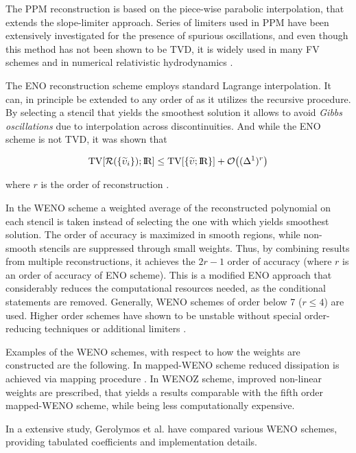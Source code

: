 The PPM reconstruction is based on the piece-wise parabolic interpolation, that extends the slope-limiter approach. 
Series of limiters used in PPM have been extensively investigated for the presence of spurious oscillations, and even though this method has not been shown to be TVD, it is widely used in many FV schemes and in numerical relativistic hydrodynamics \cite{Baiotti:2004wn,Mignone:2005ns}.

The ENO reconstruction scheme employs standard Lagrange interpolation. 
It can, in principle be extended to any order of as it utilizes the recursive procedure. 
By selecting a stencil that yields the smoothest solution it allows to avoid \textit{Gibbs oscillations} due to interpolation across discontinuities. 
And while the ENO scheme is not TVD, it was shown that 

\begin{equation}
\text{TV}[\mathcal{R}(\{\widetilde{\upsilon}_i\}); \text{I\!R}] \leq \text{TV}[\{\widetilde{\upsilon}; \text{I\!R}\}] + \mathcal{O}\big((\Delta^1)^r\big)
\end{equation}

where $r$ is the order of reconstruction \cite{Harten:1987}. 

In the WENO scheme a weighted average of the reconstructed polynomial on each stencil is taken instead of selecting the one with which yields smoothest solution. 
The order of accuracy is maximized in smooth regions, while non-smooth stencils are suppressed through small weights. 
Thus, by combining results from multiple reconstructions, it achieves the $2r-1$ order of accuracy (where $r$ is an order of accuracy of ENO scheme). 
This is a modified ENO approach that considerably reduces the computational resources needed, as the conditional statements are removed. 
Generally, WENO schemes of order below 7 ($r\leq 4$) are used. 
Higher order schemes have shown to be unstable without special order-reducing techniques \cite{Gerolymos:2009,Tchekhovskoy:2007zn} or additional limiters \cite{Balsara:2000}.

Examples of the WENO schemes, with respect to how the weights are constructed are the following. 
In mapped-WENO scheme reduced dissipation is achieved via mapping procedure \cite{Henrick:2005}. 
In WENOZ scheme, improved non-linear weights are prescribed, that yields a results comparable with the fifth order mapped-WENO scheme, while being less computationally expensive. 

In a extensive study, Gerolymos et al. \cite{Gerolymos:2009} have compared various WENO schemes, providing tabulated coefficients and implementation details.

